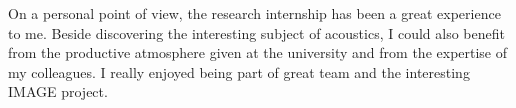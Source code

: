 \documentclass[11pt]{report} %
\begin{document}
On a personal point of view, the research internship has been a great experience to me.
Beside discovering the interesting subject of acoustics, I could also benefit from the productive atmosphere given at the university and from the expertise of my colleagues. 
I really enjoyed being part of great team and the interesting IMAGE project. 
  
%


\cite{Peter2011}
\cite{Mungur1969}
\printbibliography
\end{document}
